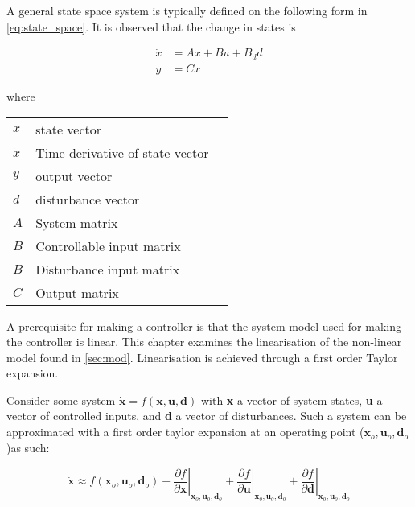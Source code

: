 A general state space system is typically defined on the following form in \cref{eq:state_space}. It is observed that the change in states is

\begin{equation} \label{eq:state_space}
	\begin{split}
		\dot{x} & = Ax + Bu + B_dd \\
		y 		& = Cx
	\end{split}
\end{equation}

where


\begin{center}
	\begin{tabular}{l p{8cm} l}
		$x$       & state vector                    &  \\
		$\dot{x}$ & Time derivative of state vector &  \\
		$y$       & output vector                   &  \\
		$d$       & disturbance vector              &  \\
		$A$       & System matrix                   &  \\
		$B$       & Controllable input matrix       &  \\
		$B$       & Disturbance input matrix        &  \\
		$C$       & Output matrix                   &
	\end{tabular}
\end{center}

A prerequisite for making a controller is that the system model used for making the controller is linear. This chapter examines the linearisation of the non-linear model found in \cref{sec:mod}. Linearisation is achieved through a first order Taylor expansion.

Consider some system $\dot{\textbf{x}} = f(\textbf{x},\textbf{u},\textbf{d})$ with \textbf{x} a vector of system states, \textbf{u} a vector of controlled inputs, and \textbf{d} a vector of disturbances. Such a system can be approximated with a first order taylor expansion at an operating point ($\textbf{x}_o, \textbf{u}_o, \textbf{d}_o$)as such:


\begin{equation} \label{eq:taylor}
	\dot{\textbf{x}}   \approx   f(\textbf{x}_o, \textbf{u}_o, \textbf{d}_o)   +   \left. \dfrac{\partial f}{\partial \textbf{x}} \right |_{\textbf{x}_o, \textbf{u}_o, \textbf{d}_o} + \left. \dfrac{\partial f}{\partial \textbf{u}} \right |_{\textbf{x}_o, \textbf{u}_o, \textbf{d}_o} + \left. \dfrac{\partial f}{\partial \textbf{d}} \right |_{\textbf{x}_o, \textbf{u}_o, \textbf{d}_o}
\end{equation}

